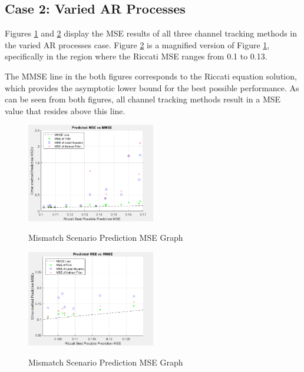 \documentclass[twocolumn,letterpaper]{IEEEAerospaceCLS}  %
\begin{document}
\newpage

\subsection{Case 2: Varied AR Processes}

Figures \ref{c2resultsall} and \ref{c2resultszoom} display the MSE results of all three channel tracking methods in the varied AR processes case. Figure \ref{c2resultszoom} is a magnified version of Figure \ref{c2resultsall}, specifically in the region where the Riccati MSE ranges from 0.1 to 0.13. 

The MMSE line in the both figures corresponds to the Riccati equation solution, which provides the asymptotic lower bound for the best possible performance. As can be seen from both figures, all channel tracking methods result in a MSE value that resides above this line. 

\begin{figure}[!h]
	\centering\includegraphics[width=0.5\textwidth]{figs/mismatchresults_all.PNG}\\
	\caption{Mismatch Scenario Prediction MSE Graph}
	\label{c2resultsall}
\end{figure}

\begin{figure}[!h]
	\centering\includegraphics[width=0.5\textwidth]{figs/mismatchresults_zoom.PNG}\\
	\caption{Mismatch Scenario Prediction MSE Graph}
	\label{c2resultszoom}
\end{figure}
\end{document}

